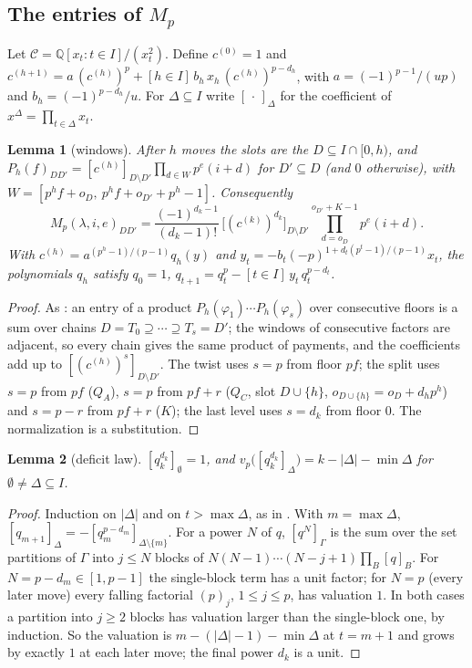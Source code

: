 \documentclass[10pt]{article}
\theoremstyle{ds}
\newtheorem{lemma}{Lemma}
\theoremstyle{dsrem}
\newcommand{\Q}{\mathbb{Q}}
\begin{document}
\subsection{The entries of $M_p$}
Let $\mathcal{C}=\Q[x_t:t\in I]/(x_t^2)$. Define $c^{(0)}=1$ and $c^{(h+1)}=a\,(c^{(h)})^p+[h\in I]\,b_h\,x_h\,(c^{(h)})^{p-d_h}$, with $a=(-1)^{p-1}/(up)$ and $b_h=(-1)^{p-d_h}/u$. For $\Delta\subseteq I$ write $[\,\cdot\,]_\Delta$ for the coefficient of $x^\Delta=\prod_{t\in\Delta}x_t$.

\begin{lemma}[windows]\label{windows}
After $h$ moves the slots are the $D\subseteq I\cap[0,h)$, and $P_h(f)_{DD'}=[c^{(h)}]_{D\setminus D'}\prod_{d\in W}p^e(i+d)$ for $D'\subseteq D$ (and $0$ otherwise), with $W=[p^hf+o_D,\ p^hf+o_{D'}+p^h-1]$. Consequently
\[
M_p(\lambda,i,e)_{DD'}=\frac{(-1)^{d_k-1}}{(d_k-1)!}\,\big[(c^{(k)})^{d_k}\big]_{D\setminus D'}\prod_{d=o_D}^{o_{D'}+K-1}p^e(i+d).
\]
With $c^{(h)}=a^{(p^h-1)/(p-1)}q_h(y)$ and $y_t=-b_t(-p)^{1+d_t(p^t-1)/(p-1)}x_t$, the polynomials $q_h$ satisfy $q_0=1$, $q_{t+1}=q_t^p-[t\in I]\,y_t\,q_t^{p-d_t}$.
\end{lemma}

\begin{proof}
As \cite[Theorem~4.4]{DST}: an entry of a product $P_h(\varphi_1)\cdots P_h(\varphi_s)$ over consecutive floors is a sum over chains $D=T_0\supseteq\cdots\supseteq T_s=D'$; the windows of consecutive factors are adjacent, so every chain gives the same product of payments, and the coefficients add up to $[(c^{(h)})^s]_{D\setminus D'}$. The twist uses $s=p$ from floor $pf$; the split uses $s=p$ from $pf$ ($Q_A$), $s=p$ from $pf+r$ ($Q_C$, slot $D\cup\{h\}$, $o_{D\cup\{h\}}=o_D+d_hp^h$) and $s=p-r$ from $pf+r$ ($K$); the last level uses $s=d_k$ from floor $0$. The normalization is a substitution.
\end{proof}

\begin{lemma}[deficit law]\label{deficit}
$[q_k^{d_k}]_\emptyset=1$, and $v_p\big([q_k^{d_k}]_\Delta\big)=k-|\Delta|-\min\Delta$ for $\emptyset\ne\Delta\subseteq I$.
\end{lemma}

\begin{proof}
Induction on $|\Delta|$ and on $t>\max\Delta$, as in \cite[Lemma~4.5]{DST}. With $m=\max\Delta$, $[q_{m+1}]_\Delta=-[q_m^{p-d_m}]_{\Delta\setminus\{m\}}$. For a power $N$ of $q$, $[q^N]_\Gamma$ is the sum over the set partitions of $\Gamma$ into $j\le N$ blocks of $N(N-1)\cdots(N-j+1)\prod_B[q]_B$. For $N=p-d_m\in[1,p-1]$ the single-block term has a unit factor; for $N=p$ (every later move) every falling factorial $(p)_j$, $1\le j\le p$, has valuation $1$. In both cases a partition into $j\ge2$ blocks has valuation larger than the single-block one, by induction. So the valuation is $m-(|\Delta|-1)-\min\Delta$ at $t=m+1$ and grows by exactly $1$ at each later move; the final power $d_k$ is a unit.
\end{proof}
\end{document}
